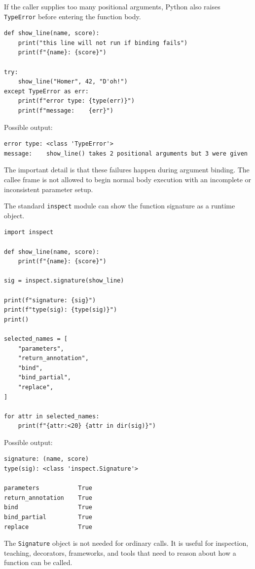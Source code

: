 If the caller supplies too many positional arguments, Python also raises \texttt{TypeError} before entering the function body.

\begin{verbatim}
def show_line(name, score):
    print("this line will not run if binding fails")
    print(f"{name}: {score}")

try:
    show_line("Homer", 42, "D'oh!")
except TypeError as err:
    print(f"error type: {type(err)}")
    print(f"message:    {err}")
\end{verbatim}

Possible output:

\begin{verbatim}
error type: <class 'TypeError'>
message:    show_line() takes 2 positional arguments but 3 were given
\end{verbatim}

The important detail is that these failures happen during argument binding. The callee frame is not allowed to begin normal body execution with an incomplete or inconsistent parameter setup.

The standard \texttt{inspect} module can show the function signature as a runtime object.

\begin{verbatim}
import inspect

def show_line(name, score):
    print(f"{name}: {score}")

sig = inspect.signature(show_line)

print(f"signature: {sig}")
print(f"type(sig): {type(sig)}")
print()

selected_names = [
    "parameters",
    "return_annotation",
    "bind",
    "bind_partial",
    "replace",
]

for attr in selected_names:
    print(f"{attr:<20} {attr in dir(sig)}")
\end{verbatim}

Possible output:

\begin{verbatim}
signature: (name, score)
type(sig): <class 'inspect.Signature'>

parameters           True
return_annotation    True
bind                 True
bind_partial         True
replace              True
\end{verbatim}

The \texttt{Signature} object is not needed for ordinary calls. It is useful for inspection, teaching, decorators, frameworks, and tools that need to reason about how a function can be called.

